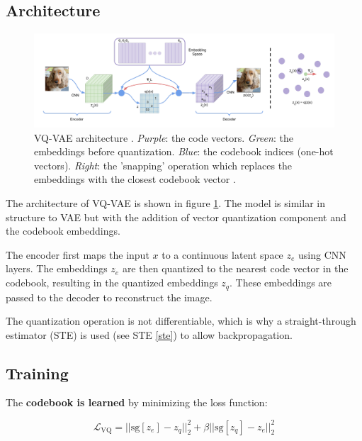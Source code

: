 \subsection{Architecture}

\begin{figure}[h]
    \centering
    \includegraphics[width=\textwidth]{images/vqvae_architecture.png}
    \caption{VQ-VAE architecture \cite{vqvae}. \textit{Purple}: the code vectors. \textit{Green}: the embeddings before quantization. \textit{Blue}: the codebook indices (one-hot vectors). \textit{Right}: the 'snapping' operation which replaces the embeddings with the closest codebook vector \cite{vqvae}.}
    \label{fig:vqvae_architecture}
\end{figure}

The architecture of VQ-VAE is shown in figure \ref{fig:vqvae_architecture}. The model is similar in structure to VAE but with the addition of vector quantization component and the codebook embeddings.

The encoder first maps the input $x$ to a continuous latent space $z_e$ using CNN layers. The embeddings $z_e$ are then quantized to the nearest code vector in the codebook, resulting in the quantized embeddings $z_q$. These embeddings are passed to the decoder to reconstruct the image.

The quantization operation is not differentiable, which is why a straight-through estimator (STE) is used (see STE \ref{ste}) to allow backpropagation.







\subsection{Training}

The \textbf{codebook is learned} by minimizing the loss function:

\begin{equation}
    \mathcal{L}_{\text{VQ}} = || \text{sg}[z_e] - z_q ||_2^2 + \beta || \text{sg}[z_q] - z_e ||_2^2
\label{eq:vq_loss}
\end{equation}


